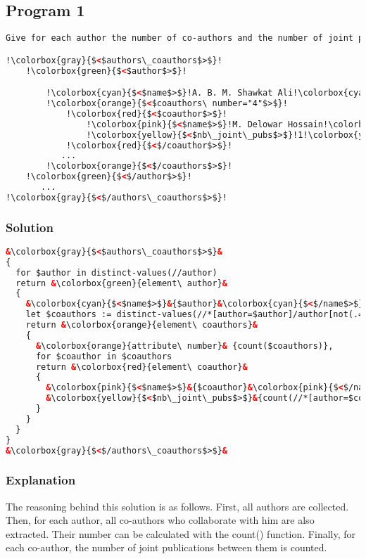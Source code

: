 \documentclass{article}
\begin{document}
\subsection{Program 1}
\begin{lstlisting}[language=xml, escapechar=!]
Give for each author the number of co-authors and the number of joint publications with each of them, using the following output format.

!\colorbox{gray}{$<$authors\_coauthors$>$}!
    !\colorbox{green}{$<$author$>$}!

        !\colorbox{cyan}{$<$name$>$}!A. B. M. Shawkat Ali!\colorbox{cyan}{$<$/name$>$}!
        !\colorbox{orange}{$<$coauthors\ number="4"$>$}!
            !\colorbox{red}{$<$coauthor$>$}!
                !\colorbox{pink}{$<$name$>$}!M. Delowar Hossain!\colorbox{pink}{$<$/name$>$}!
                !\colorbox{yellow}{$<$nb\_joint\_pubs$>$}!1!\colorbox{yellow}{$<$/nb\_joint\_pubs$>$}!
            !\colorbox{red}{$<$/coauthor$>$}!
           ...
        !\colorbox{orange}{$<$/coauthors$>$}!
    !\colorbox{green}{$<$/author$>$}!
       ...
!\colorbox{gray}{$<$/authors\_coauthors$>$}!
\end{lstlisting}

\subsubsection{Solution}
\begin{lstlisting}[language=xml, frame=none, escapechar=&]
&\colorbox{gray}{$<$authors\_coauthors$>$}&
{
  for $author in distinct-values(//author)
  return &\colorbox{green}{element\ author}&
  {
    &\colorbox{cyan}{$<$name$>$}&{$author}&\colorbox{cyan}{$<$/name$>$}&,
    let $coauthors := distinct-values(//*[author=$author]/author[not(.=$author)])
    return &\colorbox{orange}{element\ coauthors}&
    {
      &\colorbox{orange}{attribute\ number}& {count($coauthors)},
      for $coauthor in $coauthors
      return &\colorbox{red}{element\ coauthor}&
      {
        &\colorbox{pink}{$<$name$>$}&{$coauthor}&\colorbox{pink}{$<$/name$>$}&,
        &\colorbox{yellow}{$<$nb\_joint\_pubs$>$}&{count(//*[author=$coauthor]/author[.=$author]))}&\colorbox{yellow}{$<$/nb\_joint\_pubs$>$}&
      }
    }
  }
}
&\colorbox{gray}{$<$/authors\_coauthors$>$}&
\end{lstlisting}

\subsubsection{Explanation}
The reasoning behind this solution is as follows. First, all authors are collected. Then, for each author, all co-authors who collaborate with him are also extracted. Their number can be calculated with the count() function. Finally, for each co-author, the number of joint publications between them is counted.
\end{document}
